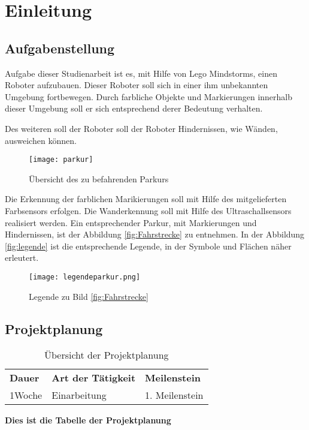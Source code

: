 \chapter{Einleitung}
\section{Aufgabenstellung}

Aufgabe dieser Studienarbeit ist es, mit Hilfe von Lego Mindstorms, einen Roboter aufzubauen. Dieser Roboter soll sich in einer ihm unbekannten Umgebung fortbewegen. Durch farbliche Objekte und Markierungen innerhalb dieser Umgebung soll er sich entsprechend derer Bedeutung verhalten. 

Des weiteren soll der Roboter soll der Roboter Hindernissen, wie Wänden, ausweichen können. 
\begin{figure}[htb]
\centering
\texttt{[image: parkur]}
\caption{Übersicht des zu befahrenden Parkurs}
\label{fig:Fahrstrecke}
\end{figure}

Die Erkennung der farblichen Marikierungen soll mit Hilfe des mitgelieferten Farbsensors erfolgen. Die Wanderkennung soll mit Hilfe des Ultraschallsensors realisiert werden. 
Ein entsprechender Parkur, mit Markierungen und Hindernissen, ist der Abbildung \vref{fig:Fahrstrecke} zu entnehmen. In der Abbildung \vref{fig:legende} ist die entsprechende Legende, in der Symbole und Flächen näher erleutert.
\begin{figure}[htp]
\centering
\texttt{[image: legendeparkur.png]}
\caption{Legende zu Bild \vref{fig:Fahrstrecke}}
\label{fig:legende}
\end{figure}

\section{Projektplanung}
\begin{table}[htp]
\centering
\begin{tabularx}{\textwidth}{|X|X|X|}
\cline{1-3}
  \textbf{ Dauer}&\textbf{Art der Tätigkeit}&\textbf{Meilenstein} \\\cline{1-3}
  1Woche& Einarbeitung & 1. Meilenstein\\\cline{1-3}
\end{tabularx}
\caption{Übersicht der Projektplanung}
\label{tab:projektplaung}
\end{table}
\textbf{Dies ist die Tabelle der Projektplanung}

